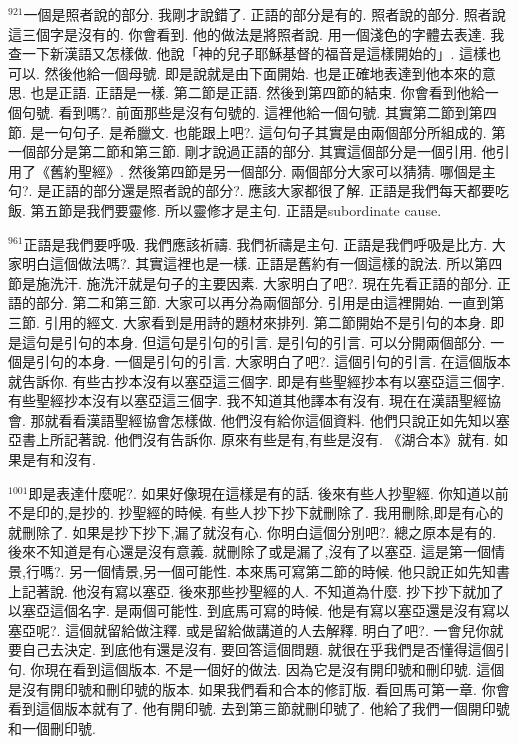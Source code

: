 \documentclass{book}
\begin{document}
$^{921}$一個是照者說的部分.
我剛才說錯了.
正語的部分是有的.
照者說的部分.
照者說這三個字是沒有的.
你會看到.
他的做法是將照者說.
用一個淺色的字體去表達.
我查一下新漢語又怎樣做.
他說「神的兒子耶穌基督的福音是這樣開始的」.
這樣也可以.
然後他給一個母號.
即是說就是由下面開始.
也是正確地表達到他本來的意思.
也是正語.
正語是一樣.
第二節是正語.
然後到第四節的結束.
你會看到他給一個句號.
看到嗎?.
前面那些是沒有句號的.
這裡他給一個句號.
其實第二節到第四節.
是一句句子.
是希臘文.
也能跟上吧?.
這句句子其實是由兩個部分所組成的.
第一個部分是第二節和第三節.
剛才說過正語的部分.
其實這個部分是一個引用.
他引用了《舊約聖經》.
然後第四節是另一個部分.
兩個部分大家可以猜猜.
哪個是主句?.
是正語的部分還是照者說的部分?.
應該大家都很了解.
正語是我們每天都要吃飯.
第五節是我們要靈修.
所以靈修才是主句.
正語是subordinate cause.

$^{961}$正語是我們要呼吸.
我們應該祈禱.
我們祈禱是主句.
正語是我們呼吸是比方.
大家明白這個做法嗎?.
其實這裡也是一樣.
正語是舊約有一個這樣的說法.
所以第四節是施洗汗.
施洗汗就是句子的主要因素.
大家明白了吧?.
現在先看正語的部分.
正語的部分.
第二和第三節.
大家可以再分為兩個部分.
引用是由這裡開始.
一直到第三節.
引用的經文.
大家看到是用詩的題材來排列.
第二節開始不是引句的本身.
即是這句是引句的本身.
但這句是引句的引言.
是引句的引言.
可以分開兩個部分.
一個是引句的本身.
一個是引句的引言.
大家明白了吧?.
這個引句的引言.
在這個版本就告訴你.
有些古抄本沒有以塞亞這三個字.
即是有些聖經抄本有以塞亞這三個字.
有些聖經抄本沒有以塞亞這三個字.
我不知道其他譯本有沒有.
現在在漢語聖經協會.
那就看看漢語聖經協會怎樣做.
他們沒有給你這個資料.
他們只說正如先知以塞亞書上所記著說.
他們沒有告訴你.
原來有些是有,有些是沒有.
《湖合本》就有.
如果是有和沒有.

$^{1001}$即是表達什麼呢?.
如果好像現在這樣是有的話.
後來有些人抄聖經.
你知道以前不是印的,是抄的.
抄聖經的時候.
有些人抄下抄下就刪除了.
我用刪除,即是有心的就刪除了.
如果是抄下抄下,漏了就沒有心.
你明白這個分別吧?.
總之原本是有的.
後來不知道是有心還是沒有意義.
就刪除了或是漏了,沒有了以塞亞.
這是第一個情景,行嗎?.
另一個情景,另一個可能性.
本來馬可寫第二節的時候.
他只說正如先知書上記著說.
他沒有寫以塞亞.
後來那些抄聖經的人.
不知道為什麼.
抄下抄下就加了以塞亞這個名字.
是兩個可能性.
到底馬可寫的時候.
他是有寫以塞亞還是沒有寫以塞亞呢?.
這個就留給做注釋.
或是留給做講道的人去解釋.
明白了吧?.
一會兒你就要自己去決定.
到底他有還是沒有.
要回答這個問題.
就很在乎我們是否懂得這個引句.
你現在看到這個版本.
不是一個好的做法.
因為它是沒有開印號和刪印號.
這個是沒有開印號和刪印號的版本.
如果我們看和合本的修訂版.
看回馬可第一章.
你會看到這個版本就有了.
他有開印號.
去到第三節就刪印號了.
他給了我們一個開印號和一個刪印號.
\end{document}
